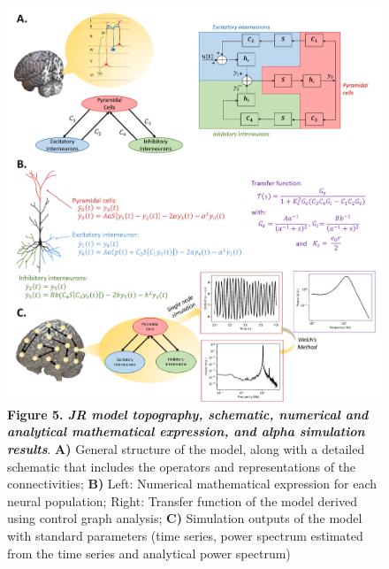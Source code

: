\documentclass[12pt,twoside]{article}
\begin{document}
\begin{figure}[H]
    \centering
    \includegraphics[scale=0.45]{Images/Jansen_rit_schematic_4.png}
    \caption*{\textbf{Figure 5.  \textit{JR model topography, schematic, numerical and analytical mathematical expression, and alpha simulation results}}. \textbf{A)} General structure of the model, along with a detailed schematic that includes the operators and representations of the connectivities; \textbf{B)} Left: Numerical mathematical expression for each neural population; Right: Transfer function of the model derived using control graph analysis; \textbf{C)} Simulation outputs of the model with standard parameters (time series, power spectrum estimated from the time series and analytical power spectrum)}
    \label{fig:JR_full}
\end{figure}
\end{document}
